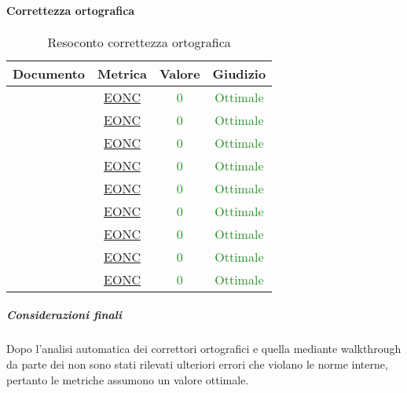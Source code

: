 \paragraph{Correttezza ortografica}
	\begin{table}[H]
		\centering
		\small
		\begin{tabular}{c | c | c | c}
			\hline
			\textbf{Documento} & \textbf{Metrica} & \textbf{Valore} & \textbf{Giudizio} \\
			\hline
				\pdpvdue  &     \hyperref[MCO]{EONC} & \textcolor{ForestGreen}{0} & \textcolor{ForestGreen}{Ottimale} \\
				\pdqvdue  &      \hyperref[MCO]{EONC} & \textcolor{ForestGreen}{0} & \textcolor{ForestGreen}{Ottimale} \\
				\ndpvdue   &   \hyperref[MCO]{EONC} & \textcolor{ForestGreen}{0} & \textcolor{ForestGreen}{Ottimale} \\
				\adrvdue   &   \hyperref[MCO]{EONC} & \textcolor{ForestGreen}{0} & \textcolor{ForestGreen}{Ottimale} \\
				\stvuno &	\hyperref[MCO]{EONC} & \textcolor{ForestGreen}{0} & \textcolor{ForestGreen}{Ottimale} \\
				\glvdue &     \hyperref[MCO]{EONC} & \textcolor{ForestGreen}{0} & \textcolor{ForestGreen}{Ottimale} \\
				\vcinquei&      \hyperref[MCO]{EONC} & \textcolor{ForestGreen}{0} & \textcolor{ForestGreen}{Ottimale} \\
				\vseii   &  \hyperref[MCO]{EONC} & \textcolor{ForestGreen}{0} & \textcolor{ForestGreen}{Ottimale} \\
				\vtree   &  \hyperref[MCO]{EONC} & \textcolor{ForestGreen}{0} & \textcolor{ForestGreen}{Ottimale} \\
			\hline
		\end{tabular}
		\caption{Resoconto correttezza ortografica}
		\label{tab_resoconto_correttezza_ortografica}
	\end{table}
	
	\subparagraph{Considerazioni finali}
	Dopo l'analisi automatica dei correttori ortografici e quella mediante walkthrough da parte dei \verificatori{} non sono stati rilevati ulteriori errori che violano le norme interne, pertanto le metriche assumono un valore ottimale.
	
